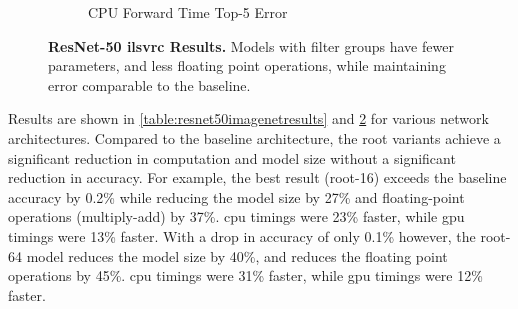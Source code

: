 \documentclass[thesis]{subfiles}
\begin{document}
\begin{figure}[p]
\begin{subfigure}[b]{\textwidth}
			\centering
			\caption{CPU Forward Time \vs Top-5 Error}
			\label{fig:resnet50cpuforward}
		\end{subfigure}
		\caption[ResNet-50 \gls{ilsvrc} results]{\textbf{ResNet-50 \gls{ilsvrc} Results.} Models with filter groups have fewer parameters, and less floating point operations, while maintaining error comparable to the baseline.}
		\label{fig:resnet50plots}
	\end{figure}
	Results are shown in \cref{table:resnet50imagenetresults} and \cref{fig:resnet50plots} for various network architectures. Compared to the baseline architecture, the root variants achieve a significant reduction in computation and model size without a significant reduction in accuracy. For example, the best result (root-16) exceeds the baseline accuracy by 0.2\% while reducing the model size by 27\% and floating-point operations (multiply-add) by 37\%. \gls{cpu} timings were 23\% faster, while \gls{gpu} timings were 13\% faster. With a drop in accuracy of only 0.1\% however, the root-64 model reduces the model size by 40\%, and reduces the floating point operations by 45\%. \gls{cpu} timings were 31\% faster, while \gls{gpu} timings were 12\% faster. 
	
\end{document}
